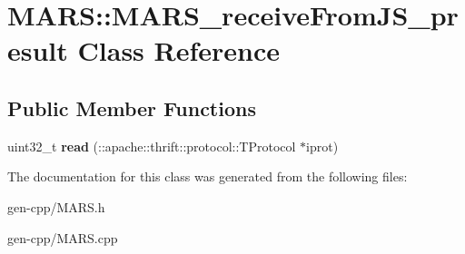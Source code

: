 \hypertarget{classMARS_1_1MARS__receiveFromJS__presult}{}\section{M\+A\+RS\+:\+:M\+A\+R\+S\+\_\+receive\+From\+J\+S\+\_\+presult Class Reference}
\label{classMARS_1_1MARS__receiveFromJS__presult}
\subsection*{Public Member Functions}
\begin{DoxyCompactItemize}
\item 
\mbox{\label{classMARS_1_1MARS__receiveFromJS__presult_a6f8bda1ea6f8d4ec7bd6e692d00b8240}} 
uint32\+\_\+t {\bfseries read} (\+::apache\+::thrift\+::protocol\+::\+T\+Protocol $\ast$iprot)
\end{DoxyCompactItemize}


The documentation for this class was generated from the following files\+:\begin{DoxyCompactItemize}
\item 
gen-\/cpp/M\+A\+R\+S.\+h\item 
gen-\/cpp/M\+A\+R\+S.\+cpp\end{DoxyCompactItemize}

